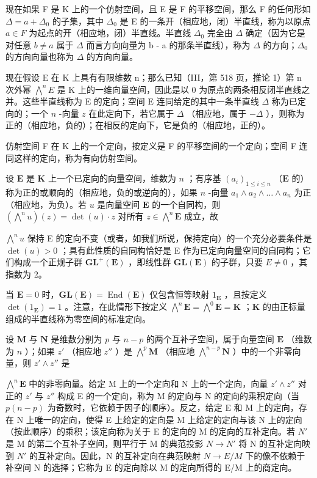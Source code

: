 现在如果 F 是 K 上的一个仿射空间，且 E 是 F 的平移空间，那么 F 的任何形如 \(\Delta = a + \Delta_{0}\) 的子集，其中 \(\Delta_{0}\) 是 E 的一条开（相应地，闭）半直线，称为以原点 \(a \in F\) 为起点的开（相应地，闭）半直线。半直线 \(\Delta_{0}\) 完全由 \(\Delta\) 确定（因为它是对任意 \(b \neq a\) 属于 \(\Delta\) 而言方向向量为 b - a 的那条半直线），称为 \(\Delta\) 的方向；\(\Delta_{0}\) 的方向向量也称为 \(\Delta\) 的方向向量。

现在假设 E 在 K 上具有有限维数 n；那么已知（III，第 518 页，推论 1）第 n 次外幂 \(\bigwedge^{n}E\) 是 K 上的一维向量空间，因此是以 0 为原点的两条相反闭半直线之并。这些半直线称为 E 的定向；空间 E 连同给定的其中一条半直线 \(\Delta\) 称为已定向的；一个 \(n\) -向量 \(z\) 在此定向下，若它属于 \(\Delta\) （相应地，属于 \(-\Delta\) ），则称为正的（相应地，负的）；在相反的定向下，它是负的（相应地，正的）。

仿射空间 F 在 K 上的一个定向，按定义是 F 的平移空间的一个定向；空间 F 连同这样的定向，称为有向仿射空间。

设 \(\mathbf{E}\) 是 \(\mathbf{K}\) 上一个已定向的向量空间，维数为 \(n\) ；有序基 \((a_i)_{1 \leqslant i \leqslant n}\) （\(\mathbf{E}\) 的）称为正的或顺向的（相应地，负的或逆向的），如果 \(n\) -向量 \(a_1 \wedge a_2 \wedge \ldots \wedge a_n\) 为正（相应地，为负）。若 \(u\) 是向量空间 \(\mathbf{E}\) 的一个自同构，则 \((\bigwedge^{n} u)(z) = \det(u) \cdot z\) 对所有 \(z \in \bigwedge^{n} \mathbf{E}\) 成立，故

\(\bigwedge^{n} u\) 保持 E 的定向不变（或者，如我们所说，保持定向）的一个充分必要条件是 \(\det(u) > 0\) ；具有此性质的自同构恰好是 E 作为已定向向量空间的自同构；它们构成一个正规子群 \(\mathbf{GL}^{+}(\mathbf{E})\) ，即线性群 \(\mathbf{GL}(\mathbf{E})\) 的子群，只要 \(E \neq 0\) ，其指数为 2。

当 \(\mathbf{E} = 0\) 时，\(\mathbf{GL}(\mathbf{E}) = \operatorname{End}(\mathbf{E})\) 仅包含恒等映射 \(1_{\mathbf{E}}\) ，且按定义 \(\det(1_{\mathbf{E}}) = 1\) 。注意，在此情形下按定义 \(\bigwedge^{n}\mathbf{E} = \bigwedge^{0}\mathbf{E} = \mathbf{K}\) ；\(\mathbf{K}\) 的由正标量组成的半直线称为零空间的标准定向。

设 \(\mathbf{M}\) 与 \(\mathbf{N}\) 是维数分别为 \(p\) 与 \(n - p\) 的两个互补子空间，属于向量空间 \(\mathbf{E}\) （维数为 \(n\) ）；如果 \(z'\) （相应地 \(z''\) ）是 \(\bigwedge^{p} \mathbf{M}\) （相应地 \(\bigwedge^{n - p} \mathbf{N}\) ）中的一个非零向量，则 \(z' \wedge z''\) 是

\(\bigwedge^{n} \mathbf{E}\) 中的非零向量。给定 M 上的一个定向和 N 上的一个定向，向量 \(z' \wedge z''\) 对正的 \(z'\) 与 \(z''\) 构成 E 的一个定向，称为 M 的定向与 N 的定向的乘积定向（当 \(p(n - p)\) 为奇数时，它依赖于因子的顺序）。反之，给定 E 和 M 上的定向，存在 N 上唯一的定向，使得 E 上给定的定向是 M 上给定的定向与该 N 上的定向（按此顺序）的乘积；该定向称为关于 E 的定向的 M 的定向的互补定向。若 \(N'\) 是 M 的第二个互补子空间，则平行于 M 的典范投影 \(N \to N'\) 将 N 的互补定向映到 \(N'\) 的互补定向。因此，N 的互补定向在典范映射 \(N \to E/M\) 下的像不依赖于补空间 N 的选择；它称为 E 的定向除以 M 的定向所得的 E/M 上的商定向。

